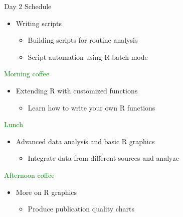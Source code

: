 \documentclass{beamer}
\begin{document}
\begin{frame}{Day 2 Schedule}

\begin{itemize}
  \item Writing scripts
  \begin{itemize}
      \item Building scripts for routine analysis
      \item Script automation using R batch mode
  \end{itemize}
\end{itemize}
\textcolor{green}{Morning coffee}
\begin{itemize}
  \item Extending R with customized functions
  \begin{itemize}
      \item Learn how to write your own R functions
  \end{itemize}
\end{itemize}
\textcolor{green}{Lunch}
\begin{itemize}
    \item Advanced data analysis and basic R graphics
    \begin{itemize}
        \item Integrate data from different sources and analyze
    \end{itemize}
\end{itemize}
\textcolor{green}{Afternoon coffee}
\begin{itemize}
    \item More on R graphics
    \begin{itemize}
        \item Produce publication quality charts
    \end{itemize}
\end{itemize}

\end{frame}
\end{document}
